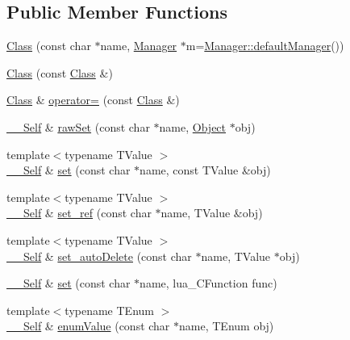 \subsection*{Public Member Functions}
\begin{DoxyCompactItemize}
\item 
\hyperlink{classSLB_1_1Class_aaa5ceaef19f102e4e54b20ee451c4d5d}{Class} (const char $\ast$name, \hyperlink{classSLB_1_1Manager}{Manager} $\ast$m=\hyperlink{classSLB_1_1Manager_a174e4612520c3412d10a68e659651677}{Manager\+::default\+Manager}())
\item 
\hyperlink{classSLB_1_1Class_a237e3615bade19b4afcb1455d2b3f899}{Class} (const \hyperlink{classSLB_1_1Class}{Class} \&)
\item 
\hyperlink{classSLB_1_1Class}{Class} \& \hyperlink{classSLB_1_1Class_a064a5f8835ffc99ea6f95bcaaf5298f3}{operator=} (const \hyperlink{classSLB_1_1Class}{Class} \&)
\item 
\hyperlink{classSLB_1_1Class_aef6fc94f5e50c96268e669ab6946ad8b}{\+\_\+\+\_\+\+Self} \& \hyperlink{classSLB_1_1Class_a485eab29b6906b018a5c312005aa6970}{raw\+Set} (const char $\ast$name, \hyperlink{classSLB_1_1Object}{Object} $\ast$obj)
\item 
{\footnotesize template$<$typename T\+Value $>$ }\\\hyperlink{classSLB_1_1Class_aef6fc94f5e50c96268e669ab6946ad8b}{\+\_\+\+\_\+\+Self} \& \hyperlink{classSLB_1_1Class_a3d4e9924785cbc368715f984fa9df7ef}{set} (const char $\ast$name, const T\+Value \&obj)
\item 
{\footnotesize template$<$typename T\+Value $>$ }\\\hyperlink{classSLB_1_1Class_aef6fc94f5e50c96268e669ab6946ad8b}{\+\_\+\+\_\+\+Self} \& \hyperlink{classSLB_1_1Class_afb73ed90fad9a334832cbc8c27414cc1}{set\+\_\+ref} (const char $\ast$name, T\+Value \&obj)
\item 
{\footnotesize template$<$typename T\+Value $>$ }\\\hyperlink{classSLB_1_1Class_aef6fc94f5e50c96268e669ab6946ad8b}{\+\_\+\+\_\+\+Self} \& \hyperlink{classSLB_1_1Class_a6a85c08a1da74997de21cc77716748c1}{set\+\_\+auto\+Delete} (const char $\ast$name, T\+Value $\ast$obj)
\item 
\hyperlink{classSLB_1_1Class_aef6fc94f5e50c96268e669ab6946ad8b}{\+\_\+\+\_\+\+Self} \& \hyperlink{classSLB_1_1Class_a62c675232ff3b4166307826ae0ac8aa0}{set} (const char $\ast$name, lua\+\_\+\+C\+Function func)
\item 
{\footnotesize template$<$typename T\+Enum $>$ }\\\hyperlink{classSLB_1_1Class_aef6fc94f5e50c96268e669ab6946ad8b}{\+\_\+\+\_\+\+Self} \& \hyperlink{classSLB_1_1Class_a2ab1fd051a15ef64b0182d4841cf3378}{enum\+Value} (const char $\ast$name, T\+Enum obj)

\end{DoxyCompactItemize}
